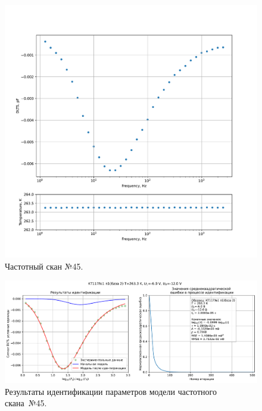 \begin{figure}[!ht]
    \centering
    \includegraphics[width=1\textwidth]{../plots/КТ117№1_п1(база 2)_2500Гц-1Гц_1пФ_-10С_-6В-12В_100мВ_20мкс_шаг_0,1.pdf}
    \caption{Частотный скан №45.}
    \label{pic:frequency_scan_45}
\end{figure}

\begin{figure}[!ht]
    \centering
    \includegraphics[width=1\textwidth]{../plots/КТ117№1_п1(база 2)_2500Гц-1Гц_1пФ_-10С_-6В-12В_100мВ_20мкс_шаг_0,1_model.pdf}
    \caption{Результаты идентификации параметров модели частотного скана~№45.}
    \label{pic:frequency_scan_model45}
\end{figure}

\pagebreak


